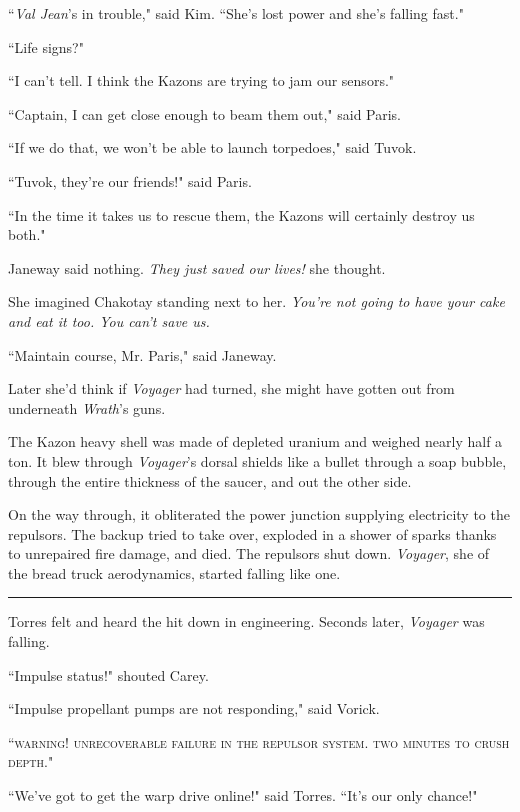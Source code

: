 \documentclass[twoside,letterpaper,12pt]{memoir}
\begin{document}
``\textit{Val Jean}'s in trouble," said Kim. ``She's lost power and she's falling fast."

``Life signs?"

``I can't tell. I think the Kazons are trying to jam our sensors."

``Captain, I can get close enough to beam them out," said Paris.

``If we do that, we won't be able to launch torpedoes," said Tuvok.

``Tuvok, they're our friends!" said Paris.

``In the time it takes us to rescue them, the Kazons will certainly destroy us both."

Janeway said nothing. \textit{They just saved our lives!} she thought.

She imagined Chakotay standing next to her. \textit{You're not going to have your cake and eat it too. You can't save us.}

``Maintain course, Mr. Paris," said Janeway.

Later she'd think if \textit{Voyager} had turned, she might have gotten out from underneath \textit{Wrath}'s guns.

The Kazon heavy shell was made of depleted uranium and weighed nearly half a ton. It blew through \textit{Voyager}'s dorsal shields like a bullet through a soap bubble, through the entire thickness of the saucer, and out the other side.

On the way through, it obliterated the power junction supplying electricity to the repulsors. The backup tried to take over, exploded in a shower of sparks thanks to unrepaired fire damage, and died. The repulsors shut down. \textit{Voyager}, she of the bread truck aerodynamics, started falling like one.

\begin{center}\rule{3cm}{0.4 pt}\end{center}

Torres felt and heard the hit down in engineering. Seconds later, \textit{Voyager} was falling.

``Impulse status!" shouted Carey.

``Impulse propellant pumps are not responding," said Vorick.

``\textsc{warning! unrecoverable failure in the repulsor system. two minutes to crush depth.}"

``We've got to get the warp drive online!" said Torres. ``It's our only chance!"
\end{document}
